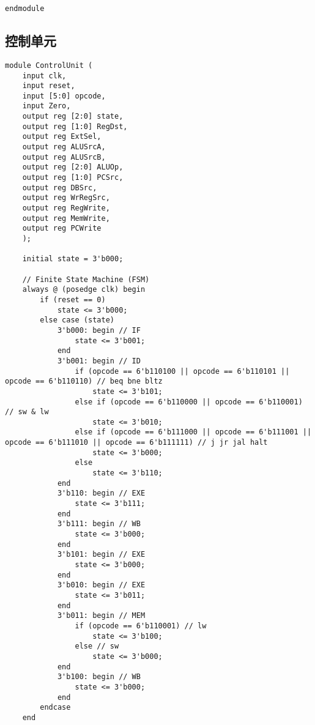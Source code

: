 \begin{multicols}{2}
\begin{lstlisting}
endmodule
\end{lstlisting}

\subsection{控制单元}
\begin{lstlisting}
module ControlUnit (
    input clk,
    input reset,
    input [5:0] opcode,
    input Zero,
    output reg [2:0] state,
    output reg [1:0] RegDst,
    output reg ExtSel,
    output reg ALUSrcA,
    output reg ALUSrcB,
    output reg [2:0] ALUOp,
    output reg [1:0] PCSrc,
    output reg DBSrc,
    output reg WrRegSrc,
    output reg RegWrite,
    output reg MemWrite,
    output reg PCWrite
    );

    initial state = 3'b000;

    // Finite State Machine (FSM)
    always @ (posedge clk) begin
        if (reset == 0)
            state <= 3'b000;
        else case (state)
            3'b000: begin // IF
                state <= 3'b001;
            end
            3'b001: begin // ID
                if (opcode == 6'b110100 || opcode == 6'b110101 || opcode == 6'b110110) // beq bne bltz
                    state <= 3'b101;
                else if (opcode == 6'b110000 || opcode == 6'b110001) // sw & lw
                    state <= 3'b010;
                else if (opcode == 6'b111000 || opcode == 6'b111001 || opcode == 6'b111010 || opcode == 6'b111111) // j jr jal halt
                    state <= 3'b000;
                else
                    state <= 3'b110;
            end
            3'b110: begin // EXE
                state <= 3'b111;
            end
            3'b111: begin // WB
                state <= 3'b000;
            end
            3'b101: begin // EXE
                state <= 3'b000;
            end
            3'b010: begin // EXE
                state <= 3'b011;
            end
            3'b011: begin // MEM
                if (opcode == 6'b110001) // lw
                    state <= 3'b100;
                else // sw
                    state <= 3'b000;
            end
            3'b100: begin // WB
                state <= 3'b000;
            end
        endcase
    end


\end{lstlisting}
\end{multicols}
